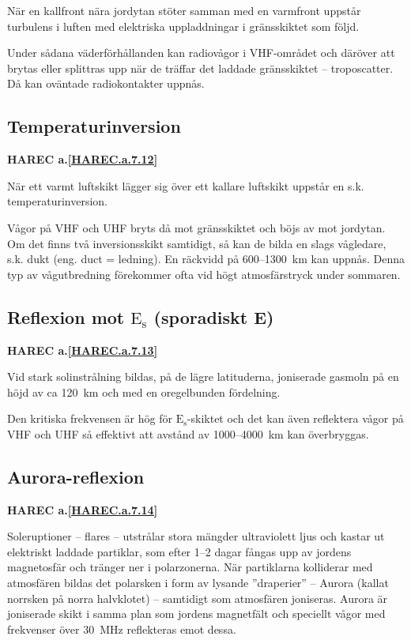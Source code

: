 När en kallfront nära jordytan stöter samman med en varmfront
uppstår turbulens i luften med elektriska uppladdningar i
gränsskiktet som följd.

Under sådana väderförhållanden kan radiovågor i VHF-området och
däröver att brytas eller splittras upp när de träffar det laddade
gränsskiktet -- troposcatter. Då kan oväntade radiokontakter uppnås.

\subsection{Temperaturinversion}
\textbf{
HAREC a.\ref{HAREC.a.7.12}\label{myHAREC.a.7.12}
}

När ett varmt luftskikt lägger sig över ett kallare luftskikt uppstår
en s.k. temperaturinversion.

Vågor på VHF och UHF bryts då mot gränsskiktet och böjs av mot
jordytan. Om det finns två inversionsskikt samtidigt, så kan de bilda
en slags vågledare, s.k. dukt (eng. duct = ledning). En räckvidd på
600--1300~km kan uppnås. Denna typ av vågutbredning förekommer ofta
vid högt atmosfärstryck under sommaren.

\subsection{Reflexion mot \(\mathrm{E_s}\) (sporadiskt E)}
\textbf{
HAREC a.\ref{HAREC.a.7.13}\label{myHAREC.a.7.13}
}

Vid stark solinstrålning bildas, på de lägre latituderna, joniserade
gasmoln på en höjd av ca 120~km och med en oregelbunden fördelning.

Den kritiska frekvensen är hög för \(\mathrm{E_s}\)-skiktet och det
kan även reflektera vågor på VHF och UHF så effektivt att avstånd av
1000--4000~km kan överbryggas.

\subsection{Aurora-reflexion}
\textbf{
HAREC a.\ref{HAREC.a.7.14}\label{myHAREC.a.7.14}
}

Soleruptioner -- flares -- utstrålar stora mängder ultraviolett ljus och
kastar ut elektriskt laddade partiklar, som efter 1--2 dagar fångas upp
av jordens magnetosfär och tränger ner i polarzonerna. När partiklarna
kolliderar med atmosfären bildas det polarsken i form av lysande
''draperier'' -- Aurora (kallat norrsken på norra halvklotet) -- samtidigt
som atmosfären joniseras. Aurora är joniserade skikt i samma plan som
jordens magnetfält och speciellt vågor med frekvenser över 30~MHz
reflekteras emot dessa.

